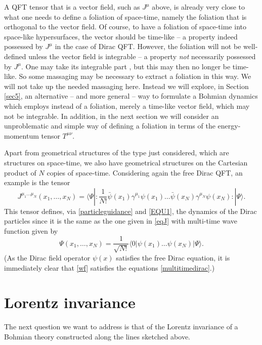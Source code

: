 \documentclass[12pt]{article}
\begin{document}
A QFT tensor that is a vector field,  such as
$J^\mu$ above,  is already very close to what one needs to define
a foliation of space-time, namely the foliation that is orthogonal to
the vector field.  
Of course, to have a foliation of space-time into
space-like hypersurfaces, the vector should be time-like -- a property
indeed possessed by $J^\mu$ in the case of Dirac QFT.  However, the foliation will not be
well-defined  unless the vector field is integrable \cite{hicks65} -- a property
\emph{not} necessarily possessed by $J^\mu$.  One may take its
integrable part \cite{duerr99}, but this may then no longer be time-like.  So
some massaging may be necessary to extract a foliation in this way. We will not take up the needed massaging here. Instead we will explore, in Section \ref{sec5}, an alternative -- and more general -- way to formulate a Bohmian dynamics which employs instead of a foliation, merely a time-like vector field, which may not be integrable. In addition, in the next section we will consider an unproblematic and simple way of defining a foliation in terms of the energy-momentum tensor $T^{\mu \nu}$.

Apart from geometrical structures of the type just considered, which are structures on space-time, we also have geometrical structures on the Cartesian product of $N$ copies of space-time. Considering again the free Dirac QFT, an example is the tensor
\begin{equation}
J^{\mu_1 \dots \mu_N}(x_1, \ldots , x_N) =  \langle \Psi | : \frac{1}{N!} \bar{\psi}(x_1) \gamma^{\mu_1}\psi(x_1) \ldots  \bar{\psi}(x_N) \gamma^{\mu_N}\psi(x_N) : |\Psi \rangle .
\label{multicurrent}
\end{equation}
This tensor defines, via \eqref{particleguidance} and \eqref{EQU1}, the dynamics of the Dirac particles since it is the same as  the one given in \eqref{eqJ} with  multi-time wave function 
given by \begin{equation}\label{wf}
\Psi(x_1,\dots,x_N) = \frac{1}{\sqrt{N!}} \langle 0| \psi(x_1) \dots \psi(x_N) |\Psi\rangle .
\end{equation}
(As the Dirac field operator $\psi(x)$ satisfies the free Dirac equation, it is immediately clear that \eqref{wf} satisfies the equations \eqref{multitimedirac}.) 


\section{Lorentz invariance}
\label{sec4}
The next question we want to address is that of the Lorentz invariance
of a Bohmian theory constructed along the lines sketched above. 
\end{document}
